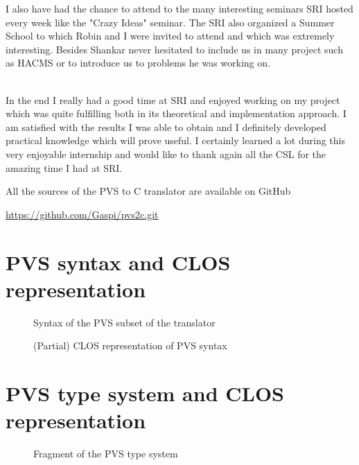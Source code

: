 \documentclass[12pt,a4paper]{article}
\begin{document}
I also have had the chance to attend to the many interesting seminars SRI hosted every week like the "Crazy Ideas" seminar. The SRI also organized a Summer School to which Robin and I were invited to attend and which was extremely interesting. Besides Shankar never hesitated to include us in many project such as HACMS or to introduce us to problems he was working on. \\
\ \newline

In the end I really had a good time at SRI and enjoyed working on my project which was quite fulfilling both in its theoretical and implementation approach. I am satisfied with the results I was able to obtain and I definitely developed practical knowledge which will prove useful. I certainly learned a lot during this very enjoyable internship and would like to thank again all the CSL for the amazing time I had at SRI.


\printbibliography

All the sources of the PVS to C translator are available on GitHub
\begin{center}
\href{https://github.com/Gaspi/pvs2c.git}{https://github.com/Gaspi/pvs2c.git}
\end{center}


\appendix

\newpage
\section{PVS syntax and CLOS representation}

\begin{figure}[h]

\caption{Syntax of the PVS subset of the translator}
\label{fig:PVSsyntax}
\end{figure}

\begin{figure}[!ht]

\caption{(Partial) CLOS representation of PVS syntax}
\label{fig:PVS-CLOS}
\end{figure}

\newpage
\section{PVS type system and CLOS representation}

\begin{figure}[!ht]

\caption{Fragment of the PVS type system}
\label{fig:PVS-types}
\end{figure}
\end{document}
